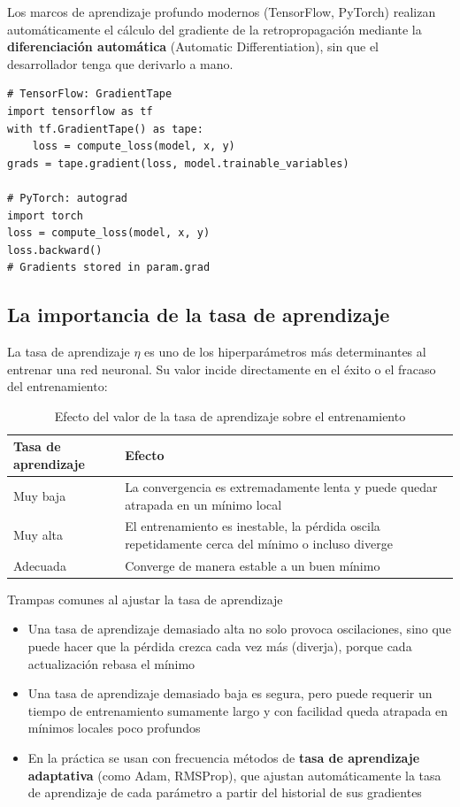\documentclass[a4paper]{article}
\begin{document}
Los marcos de aprendizaje profundo modernos (TensorFlow, PyTorch) realizan automáticamente el cálculo del gradiente de la retropropagación mediante la \textbf{diferenciación automática} (Automatic Differentiation), sin que el desarrollador tenga que derivarlo a mano.

\begin{lstlisting}[caption={Diferenciación automática en TensorFlow y PyTorch}]
# TensorFlow: GradientTape
import tensorflow as tf
with tf.GradientTape() as tape:
    loss = compute_loss(model, x, y)
grads = tape.gradient(loss, model.trainable_variables)

# PyTorch: autograd
import torch
loss = compute_loss(model, x, y)
loss.backward()
# Gradients stored in param.grad
\end{lstlisting}

\subsection{La importancia de la tasa de aprendizaje}

La tasa de aprendizaje $\eta$ es uno de los hiperparámetros más determinantes al entrenar una red neuronal. Su valor incide directamente en el éxito o el fracaso del entrenamiento:

\begin{table}[H]
\centering
\begin{tabular}{lp{9cm}}
\toprule
\textbf{Tasa de aprendizaje} & \textbf{Efecto} \\
\midrule
Muy baja & La convergencia es extremadamente lenta y puede quedar atrapada en un mínimo local \\
Muy alta & El entrenamiento es inestable, la pérdida oscila repetidamente cerca del mínimo o incluso diverge \\
Adecuada & Converge de manera estable a un buen mínimo \\
\bottomrule
\end{tabular}
\caption{Efecto del valor de la tasa de aprendizaje sobre el entrenamiento}
\end{table}

\begin{warningbox}{Trampas comunes al ajustar la tasa de aprendizaje}
\begin{itemize}
\item Una tasa de aprendizaje demasiado alta no solo provoca oscilaciones, sino que puede hacer que la pérdida crezca cada vez más (diverja), porque cada actualización rebasa el mínimo
\item Una tasa de aprendizaje demasiado baja es segura, pero puede requerir un tiempo de entrenamiento sumamente largo y con facilidad queda atrapada en mínimos locales poco profundos
\item En la práctica se usan con frecuencia métodos de \textbf{tasa de aprendizaje adaptativa} (como Adam, RMSProp), que ajustan automáticamente la tasa de aprendizaje de cada parámetro a partir del historial de sus gradientes
\end{itemize}
\end{warningbox}
\end{document}
